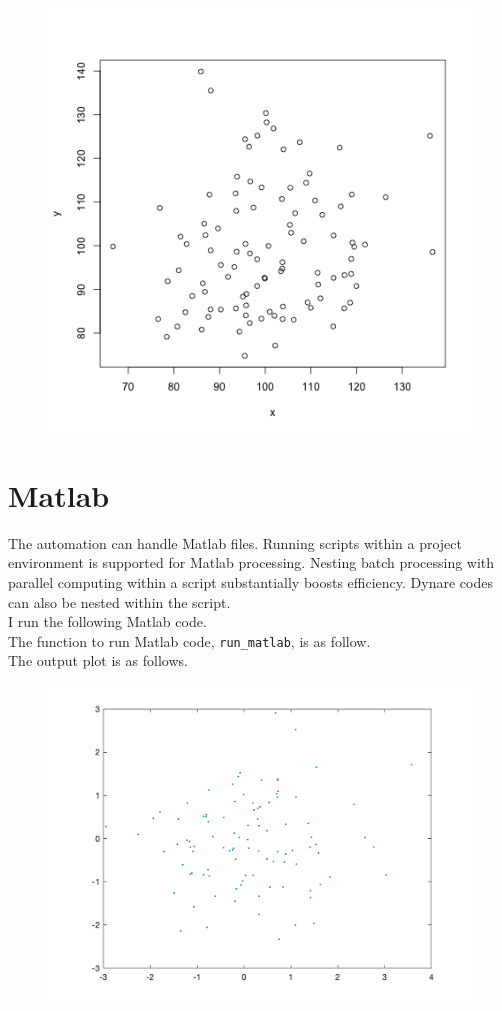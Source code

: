 \documentclass[12pt, a4paper]{article}
\begin{document}
\begin{figure}[H]
	\includegraphics[width=.5\textwidth]{sample_r_graph.png}
\end{figure}

\section{Matlab}

The automation can handle Matlab files. Running scripts within a project environment is supported for Matlab processing. Nesting batch processing with parallel computing within a script substantially boosts efficiency. Dynare codes can also be nested within the script.\\

I run the following Matlab code.\\



The function to run Matlab code, \texttt{run\_matlab}, is as follow.\\



The output plot is as follows.\\

\begin{figure}[H]
	\includegraphics[width=.5\textwidth]{sample_matlab_graph.png}
\end{figure}
\end{document}

